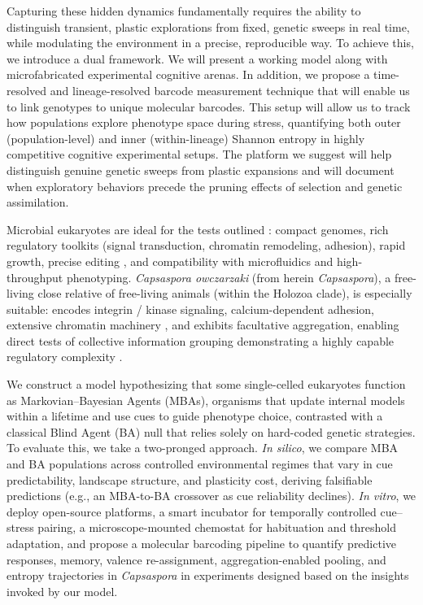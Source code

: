 \documentclass[aps,pre,twocolumn,floatfix,nofootinbib,amsmath,amssymb]{revtex4-2}
\begin{document}
Capturing these hidden dynamics fundamentally requires the ability to distinguish transient, plastic explorations from fixed, genetic sweeps in real time, while modulating the environment in a precise, reproducible way. To achieve this, we introduce a dual framework. We will present a working model along with microfabricated experimental cognitive arenas. In addition, we propose a time-resolved and lineage-resolved barcode measurement technique that will enable us to link genotypes to unique molecular barcodes. This setup will allow us to track how populations explore phenotype space during stress, quantifying both outer (population-level) and inner (within-lineage) Shannon entropy in highly competitive cognitive experimental setups. The platform we suggest will help distinguish genuine genetic sweeps from plastic expansions and will document when exploratory behaviors precede the pruning effects of selection and genetic assimilation.

Microbial eukaryotes are ideal for the tests outlined \citep{tikhonenkov_insights_2020,ros-rocher_origin_2021}: compact genomes, rich regulatory toolkits (signal transduction, chromatin remodeling, adhesion), rapid growth, precise editing \citep{phillips_genome_2022}, and compatibility with microfluidics and high-throughput phenotyping. \textit{Capsaspora owczarzaki} (from herein \textit{Capsaspora}), a free-living close relative of free-living animals (within the Holozoa clade), is especially suitable: encodes integrin / kinase signaling, calcium-dependent adhesion, extensive chromatin machinery \citep{sebe-pedros_ancient_2010,suga_capsaspora_2013,ruiz-trillo_origin_2023}, and exhibits facultative aggregation, enabling direct tests of collective information grouping demonstrating a highly capable regulatory complexity \citep{sebe-pedros_regulated_2013}.

We construct a model hypothesizing that some single-celled eukaryotes function as Markovian–Bayesian Agents (MBAs), organisms that update internal models within a lifetime and use cues to guide phenotype choice, contrasted with a classical Blind Agent (BA) null that relies solely on hard-coded genetic strategies. To evaluate this, we take a two-pronged approach. \textit{In silico}, we compare MBA and BA populations across controlled environmental regimes that vary in cue predictability, landscape structure, and plasticity cost, deriving falsifiable predictions (e.g., an MBA-to-BA crossover as cue reliability declines). \textit{In vitro}, we deploy open-source platforms, a smart incubator for temporally controlled cue–stress pairing, a microscope-mounted chemostat for habituation and threshold adaptation, and propose a molecular barcoding pipeline to quantify predictive responses, memory, valence re-assignment, aggregation-enabled pooling, and entropy trajectories in \textit{Capsaspora} in experiments designed based on the insights invoked by our model.
\end{document}
